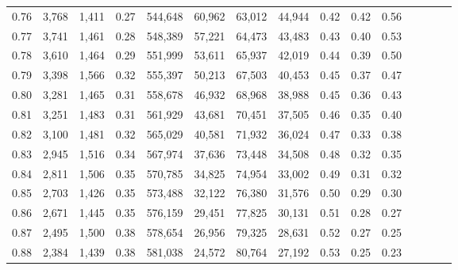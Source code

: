 \begin{tabular}{rrrcrrrrrrrrrrr}
0.76 &   3,768 &   1,411 &                                       0.27 &  544,648 &   60,962 &   63,012 &   44,944 &  0.42 &  0.42 &                         0.56 \\
0.77 &   3,741 &   1,461 &                                       0.28 &  548,389 &   57,221 &   64,473 &   43,483 &  0.43 &  0.40 &                         0.53 \\
0.78 &   3,610 &   1,464 &                                       0.29 &  551,999 &   53,611 &   65,937 &   42,019 &  0.44 &  0.39 &                         0.50 \\
0.79 &   3,398 &   1,566 &                                       0.32 &  555,397 &   50,213 &   67,503 &   40,453 &  0.45 &  0.37 &                         0.47 \\
0.80 &   3,281 &   1,465 &                                       0.31 &  558,678 &   46,932 &   68,968 &   38,988 &  0.45 &  0.36 &                         0.43 \\
0.81 &   3,251 &   1,483 &                                       0.31 &  561,929 &   43,681 &   70,451 &   37,505 &  0.46 &  0.35 &                         0.40 \\
0.82 &   3,100 &   1,481 &                                       0.32 &  565,029 &   40,581 &   71,932 &   36,024 &  0.47 &  0.33 &                         0.38 \\
0.83 &   2,945 &   1,516 &                                       0.34 &  567,974 &   37,636 &   73,448 &   34,508 &  0.48 &  0.32 &                         0.35 \\
0.84 &   2,811 &   1,506 &                                       0.35 &  570,785 &   34,825 &   74,954 &   33,002 &  0.49 &  0.31 &                         0.32 \\
0.85 &   2,703 &   1,426 &                                       0.35 &  573,488 &   32,122 &   76,380 &   31,576 &  0.50 &  0.29 &                         0.30 \\
0.86 &   2,671 &   1,445 &                                       0.35 &  576,159 &   29,451 &   77,825 &   30,131 &  0.51 &  0.28 &                         0.27 \\
0.87 &   2,495 &   1,500 &                                       0.38 &  578,654 &   26,956 &   79,325 &   28,631 &  0.52 &  0.27 &                         0.25 \\
0.88 &   2,384 &   1,439 &                                       0.38 &  581,038 &   24,572 &   80,764 &   27,192 &  0.53 &  0.25 &                         0.23 \\

\end{tabular}
